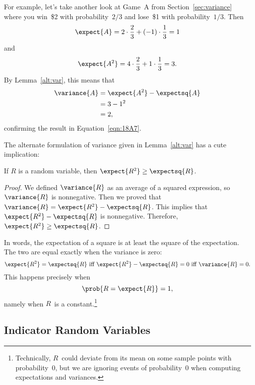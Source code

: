 For example, let's take another look at Game~A from
Section~\ref{sec:variance} where you win~\$2 with probability~$2/3$
and lose~\$1 with probability~$1/3$.  Then
\begin{equation*}
    \expect{A} = 2 \cdot \frac{2}{3} + (-1) \cdot \frac{1}{3} = 1
\end{equation*}
and
\begin{equation*}
    \expect{A^2} = 4 \cdot \frac{2}{3} + 1 \cdot \frac{1}{3} = 3.
\end{equation*}
By Lemma~\ref{alt:var}, this means that
\begin{align*}
\variance{A}
    &= \expect{A^2} - \expectsq{A} \\
    &= 3 - 1^2 \\
    &= 2,
\end{align*}
confirming the result in Equation~\ref{eqn:18A7}.

The alternate formulation of variance given in Lemma~\ref{alt:var} has
a cute implication:
\begin{corollary}
If $R$ is a random variable, then $\expect{R^2} \geq \expectsq{R}$.
\end{corollary}
\begin{proof}
We defined $\variance{R}$ as an average of a squared expression, so
$\variance{R}$ is nonnegative.  Then we proved that $\variance{R} =
\expect{R^2} - \expectsq{R}$.  This implies that $\expect{R^2} -
\expectsq{R}$ is nonnegative.  Therefore, $\expect{R^2} \geq
\expectsq{R}$.
\end{proof}

In words, the expectation of a square is at least the square of the
expectation. The two are equal exactly when the variance is zero:
\begin{equation*}
\expect{R^2} = \expectsq{R} \text{  iff  } \expect{R^2} - \expectsq{R} = 0
\text{  iff  } \variance{R} = 0.
\end{equation*}
This happens precisely when
\begin{equation*}
    \prob{R = \expect{R}} = 1,
\end{equation*}
namely when $R$~is a constant.\footnote{Technically, $R$~could deviate
  from its mean on some sample points with probability~0, but we are
  ignoring events of probability~0 when computing expectations and
  variances.}

\subsection{Indicator Random Variables}

